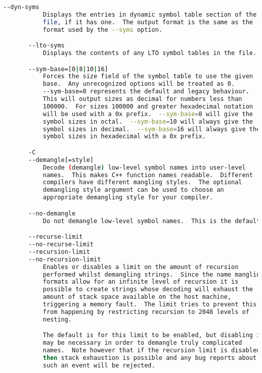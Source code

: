 {{\begin{lstlisting}[language=bash]
       --dyn-syms
           Displays the entries in dynamic symbol table section of the
           file, if it has one.  The output format is the same as the
           format used by the --syms option.

       --lto-syms
           Displays the contents of any LTO symbol tables in the file.

       --sym-base=[0|8|10|16]
           Forces the size field of the symbol table to use the given
           base.  Any unrecognized options will be treated as 0.
           --sym-base=0 represents the default and legacy behaviour.
           This will output sizes as decimal for numbers less than
           100000.  For sizes 100000 and greater hexadecimal notation
           will be used with a 0x prefix.  --sym-base=8 will give the
           symbol sizes in octal.  --sym-base=10 will always give the
           symbol sizes in decimal.  --sym-base=16 will always give the
           symbol sizes in hexadecimal with a 0x prefix.

       -C
       --demangle[=style]
           Decode (demangle) low-level symbol names into user-level
           names.  This makes C++ function names readable.  Different
           compilers have different mangling styles.  The optional
           demangling style argument can be used to choose an
           appropriate demangling style for your compiler.

       --no-demangle
           Do not demangle low-level symbol names.  This is the default.

       --recurse-limit
       --no-recurse-limit
       --recursion-limit
       --no-recursion-limit
           Enables or disables a limit on the amount of recursion
           performed whilst demangling strings.  Since the name mangling
           formats allow for an infinite level of recursion it is
           possible to create strings whose decoding will exhaust the
           amount of stack space available on the host machine,
           triggering a memory fault.  The limit tries to prevent this
           from happening by restricting recursion to 2048 levels of
           nesting.

           The default is for this limit to be enabled, but disabling it
           may be necessary in order to demangle truly complicated
           names.  Note however that if the recursion limit is disabled
           then stack exhaustion is possible and any bug reports about
           such an event will be rejected.


\end{lstlisting}}}
